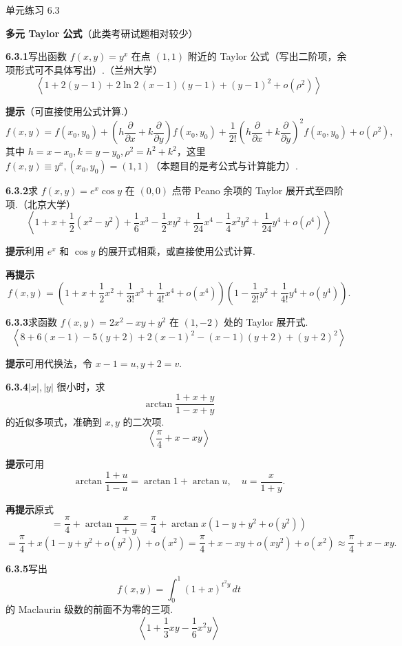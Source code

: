 \documentclass[UTF8,12pt,a4paper,fontset=fandol]{ctexart}
\begin{document}
\begin{center}
  单元练习 6.3
\end{center}

\noindent\textbf{多元 Taylor 公式}\quad （此类考研试题相对较少）

\noindent\textbf{6.3.1}\quad 写出函数 $f(x,y)=y^x$ 在点 $(1,1)$ 附近的 Taylor 公式（写出二阶项，余项形式可不具体写出）.（兰州大学）
\[
  \left\langle
  1+2(y-1)+2\ln2\,(x-1)(y-1)+(y-1)^2+o(\rho^2)
  \right\rangle
\]

\noindent\textbf{提示}\quad （可直接使用公式计算.）
\[
  f(x,y)=f(x_0,y_0)+
  \left(h\frac{\partial}{\partial x}+k\frac{\partial}{\partial y}\right)f(x_0,y_0)
  +\frac1{2!}\left(h\frac{\partial}{\partial x}+k\frac{\partial}{\partial y}\right)^2f(x_0,y_0)
  +o(\rho^2),
\]
其中 $h=x-x_0,k=y-y_0,\rho^2=h^2+k^2$，这里 $f(x,y)\equiv y^x,(x_0,y_0)=(1,1)$（本题目的是考公式与计算能力）.

\noindent\textbf{6.3.2}\quad 求 $f(x,y)=e^x\cos y$ 在 $(0,0)$ 点带 Peano 余项的 Taylor 展开式至四阶项.（北京大学）
\[
  \left\langle
  1+x+\frac12(x^2-y^2)+\frac16x^3-\frac12xy^2
  +\frac1{24}x^4-\frac14x^2y^2+\frac1{24}y^4+o(\rho^4)
  \right\rangle
\]

\noindent\textbf{提示}\quad 利用 $e^x$ 和 $\cos y$ 的展开式相乘，或直接使用公式计算.

\noindent\textbf{再提示}\quad
\[
  f(x,y)=\left(1+x+\frac12x^2+\frac1{3!}x^3+\frac1{4!}x^4+o(x^4)\right)
  \left(1-\frac1{2!}y^2+\frac1{4!}y^4+o(y^4)\right).
\]

\noindent\textbf{6.3.3}\quad 求函数 $f(x,y)=2x^2-xy+y^2$ 在 $(1,-2)$ 处的 Taylor 展开式.
\[
  \left\langle
  8+6(x-1)-5(y+2)+2(x-1)^2-(x-1)(y+2)+(y+2)^2
  \right\rangle
\]

\noindent\textbf{提示}\quad 可用代换法，令 $x-1=u,y+2=v$.

\noindent\textbf{6.3.4}\quad $|x|,|y|$ 很小时，求
\[
  \arctan\frac{1+x+y}{1-x+y}
\]
的近似多项式，准确到 $x,y$ 的二次项.
\[
  \left\langle\frac{\pi}{4}+x-xy\right\rangle
\]

\noindent\textbf{提示}\quad 可用
\[
  \arctan\frac{1+u}{1-u}=\arctan1+\arctan u,\quad
  u=\frac{x}{1+y}.
\]

\noindent\textbf{再提示}\quad 原式
\[
  =\frac{\pi}{4}+\arctan\frac{x}{1+y}
  =\frac{\pi}{4}+\arctan x(1-y+y^2+o(y^2))
\]
\[
  =\frac{\pi}{4}+x(1-y+y^2+o(y^2))+o(x^2)
  =\frac{\pi}{4}+x-xy+o(xy^2)+o(x^2)
  \approx\frac{\pi}{4}+x-xy.
\]

\noindent\textbf{6.3.5}\quad 写出
\[
  f(x,y)=\int_0^1(1+x)^{t^2y}\,dt
\]
的 Maclaurin 级数的前面不为零的三项.
\[
  \left\langle1+\frac13xy-\frac16x^2y\right\rangle
\]
\end{document}
